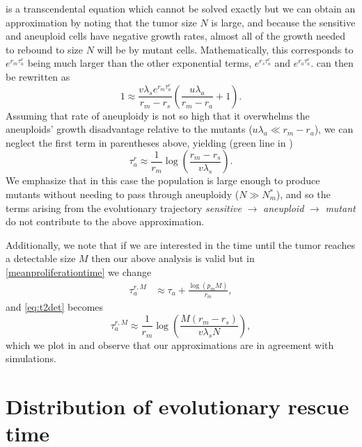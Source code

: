 \documentclass[12pt]{extarticle}
\newcommand{\e}{e}
\renewcommand{\Delta}{r}
\begin{document}
\begin{appendices}
 is a transcendental equation which cannot be solved exactly but we can obtain an approximation by noting that the tumor size $N$ is large, and because the sensitive and aneuploid cells have negative growth rates, almost all of the growth needed to rebound to size $N$ will be by mutant cells. 
Mathematically, this corresponds to $\e^{\Delta_m \tau_a^r}$ being much larger than the other exponential terms,  $\e^{\Delta_s \tau_a^r}$ and $\e^{\Delta_a \tau_a^r}$. 
 can then be rewritten as
\[
	1 \approx \frac{v \lambda_s e^{\Delta_m \tau_a^r}}{\Delta_m - \Delta_s} 
	\left(\frac{u \lambda_a}{\Delta_m - \Delta_a} + 1\right).
\]
Assuming that rate of aneuploidy is not so high that it overwhelms the aneuploids' growth disadvantage relative to the mutants ($u \lambda_a \ll \Delta_m - \Delta_a$), we can neglect the first term in parentheses above, yielding (green line in )
\begin{equation}\label{eq:t2det}
\tau_a^r\approx\frac{1}{\Delta_m}\log{\left(\frac{\Delta_m-\Delta_s}{v\lambda_s}\right)}.
\end{equation}
We emphasize that in this case the population is large enough to produce mutants without needing to pass through aneuploidy ($N \gg N_m^*$), and so  the terms arising from the evolutionary trajectory \textit{sensitive} $\rightarrow$ \textit{aneuploid} $\rightarrow$ \textit{mutant} do not contribute to the above approximation. %

Additionally, we note that if we are interested in the time until the tumor reaches a detectable size $M$ then our above analysis is valid but in \cref{meanproliferationtime} we change
\begin{align}\label{meanproliferationtime2}
\tau_a^{r,M}&\approx\tau_a+\frac{\log \left(p_mM\right)}{\Delta_m},
\end{align}
and \cref{eq:t2det} becomes
\begin{equation}\label{eq:t2det2}
\tau_a^{r,M}\approx\frac{1}{\Delta_m}\log{\left(\frac{M\left(\Delta_m-\Delta_s\right)}{v\lambda_sN}\right)},
\end{equation}
which we plot in  and observe that our approximations are in agreement with simulations.

\section{Distribution of evolutionary rescue time}\label{sec:appendix_distribution_time}


\end{appendices}
\end{document}
